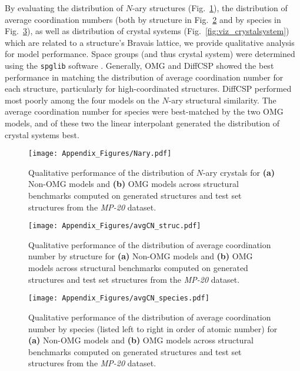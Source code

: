 By evaluating the distribution of $N$-ary structures (Fig.~\ref{fig:viz_Nary}), the distribution of average coordination numbers (both by structure in Fig.~\ref{fig:viz_CN_struc} and by species in Fig.~\ref{fig:viz_CN_species}), as well as distribution of crystal systems (Fig.~\ref{fig:viz_crystalsystem}) which are related to a structure's Bravais lattice, we provide qualitative analysis for model performance.
Space groups (and thus crystal system) were determined using the \texttt{spglib} software \cite{togo_spglib_2024}.
Generally, OMG and DiffCSP showed the best performance in matching the distribution of average coordination number for each structure, particularly for high-coordinated structures.
DiffCSP performed most poorly among the four models on the $N$-ary structural similarity.
The average coordination number for species were best-matched by the two OMG models, and of these two the linear interpolant generated the distribution of crystal systems best.

\begin{figure}[th]
   \centering
   \texttt{[image: Appendix\_Figures/Nary.pdf]}
   \caption{Qualitative performance of the distribution of $N$-ary crystals for \textbf{(a)} Non-OMG models and \textbf{(b)} OMG models across structural benchmarks computed on generated structures and test set structures from the \textit{MP-20} dataset.}
   \label{fig:viz_Nary}
\end{figure}


\begin{figure}[th]
   \centering
   \texttt{[image: Appendix\_Figures/avgCN\_struc.pdf]}
   \caption{Qualitative performance of the distribution of average coordination number by structure for \textbf{(a)} Non-OMG models and \textbf{(b)} OMG models across structural benchmarks computed on generated structures and test set structures from the \textit{MP-20} dataset.}
   \label{fig:viz_CN_struc}
\end{figure}

\begin{figure}[th]
   \centering
   \texttt{[image: Appendix\_Figures/avgCN\_species.pdf]}
   \caption{Qualitative performance of the distribution of average coordination number by species (listed left to right in order of atomic number) for \textbf{(a)} Non-OMG models and \textbf{(b)} OMG models across structural benchmarks computed on generated structures and test set structures from the \textit{MP-20} dataset.}
   \label{fig:viz_CN_species}
\end{figure}


